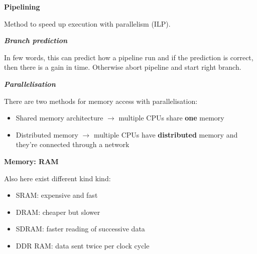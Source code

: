 \documentclass[fontsize=8pt, a4paper, landscape, fleqn]{scrartcl}
\renewcommand{\subsection}[1]{%
    \noindent\colorbox{subsectioncolor}{%
        \parbox{\dimexpr\columnwidth-2\fboxsep}{\color{white}\textbf{#1}}}%
    \vspace{0.5mm}%
}
\renewcommand{\subsubsection}[1]{%
    \noindent\textbf{\textit{\color{subsectioncolor}#1}}%
    \vspace{1mm}%
}
\begin{document}
\begin{multicols*}{3}[\raggedcolumns]
    \subsection{Pipelining}
    Method to speed up execution with parallelism (ILP).
    
    \subsubsection{Branch prediction}
    In few words, this can predict how a pipeline run and if the prediction is correct, then there is a gain in time. Otherwise abort pipeline and start right branch.

    \subsubsection{Parallelisation}
    There are two methods for memory access with parallelisation:
    \begin{multicols}{2}
    \begin{itemize}
        \item Shared memory architecture $\rightarrow$ multiple CPUs share \textbf{one} memory
        \item Distributed memory $\rightarrow$ multiple CPUs have \textbf{distributed} memory and they're connected through a network
    \end{itemize}
    \end{multicols}

    \subsection{Memory: RAM}
    Also here exist different kind kind:
    \begin{multicols}{2}
    \begin{itemize}
        \item SRAM: expensive and fast
        \item DRAM: cheaper but slower
        \item SDRAM: faster reading of successive data
        \item DDR RAM: data sent twice per clock cycle
    \end{itemize}
    \end{multicols}


\end{multicols*}
\end{document}
